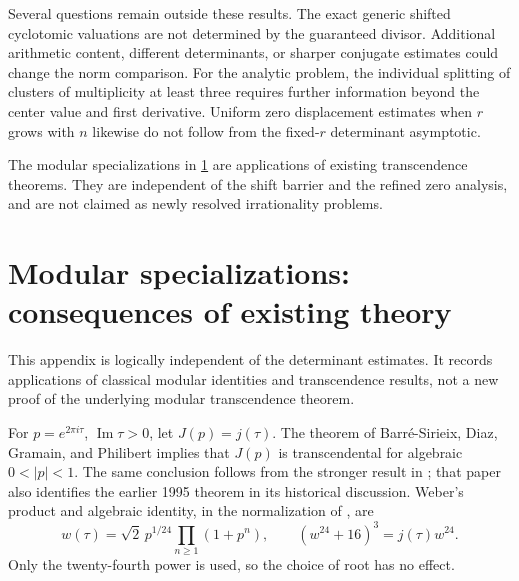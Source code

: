 \documentclass[11pt]{article}
\numberwithin{equation}{section}
\theoremstyle{definition}
\theoremstyle{remark}
\begin{document}
Several questions remain outside these results. The exact generic shifted
cyclotomic valuations are not determined by the guaranteed divisor.
Additional arithmetic content, different determinants, or sharper conjugate
estimates could change the norm comparison. For the analytic problem, the
individual splitting of clusters of multiplicity at least three requires
further information beyond the center value and first derivative.
Uniform zero displacement estimates when $r$ grows with $n$ likewise do
not follow from the fixed-$r$ determinant asymptotic.

The modular specializations in \cref{app:modular} are applications of
existing transcendence theorems. They are independent of the shift barrier
and the refined zero analysis, and are not claimed as newly resolved
irrationality problems.


\appendix
\section{Modular specializations: consequences of existing theory}\label{app:modular}

This appendix is logically independent of the determinant estimates. It
records applications of classical modular identities and transcendence
results, not a new proof of the underlying modular transcendence theorem.

For $p=e^{2\pi i\tau}$, $\operatorname{Im}\tau>0$, let
$J(p)=j(\tau)$. The theorem of Barr\'e-Sirieix, Diaz, Gramain, and
Philibert implies that $J(p)$ is transcendental for algebraic
$0<|p|<1$. The same conclusion follows from the stronger result in
\cite[Corollary 2]{Nesterenko}; that paper also identifies the earlier
1995 theorem in its historical discussion.
Weber's product and algebraic identity, in the normalization of
\cite[(9.9)--(9.11)]{Duke}, are
\begin{equation}\label{eq:weber}
 w(\tau)=\sqrt2\,p^{1/24}\prod_{n\ge1}(1+p^n),
 \qquad (w^{24}+16)^3=j(\tau)w^{24}.
\end{equation}
Only the twenty-fourth power is used, so the choice of root has no effect.
\end{document}
